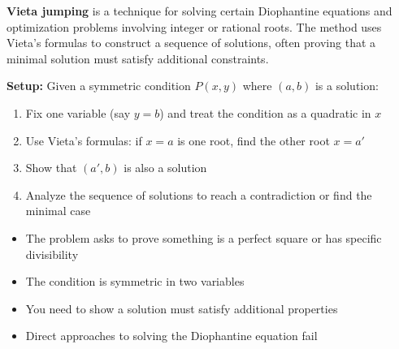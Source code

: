 \documentclass[12pt]{extarticle}
\begin{document}
\textbf{Vieta jumping} is a technique for solving certain Diophantine equations and optimization problems involving integer or rational roots. The method uses Vieta's formulas to construct a sequence of solutions, often proving that a minimal solution must satisfy additional constraints.

\begin{conceptbox}
\textbf{Setup:} Given a symmetric condition $P(x,y)$ where $(a,b)$ is a solution:
\begin{enumerate}
    \item Fix one variable (say $y=b$) and treat the condition as a quadratic in $x$
    \item Use Vieta's formulas: if $x=a$ is one root, find the other root $x=a'$
    \item Show that $(a',b)$ is also a solution
    \item Analyze the sequence of solutions to reach a contradiction or find the minimal case
\end{enumerate}
\end{conceptbox}

\begin{conceptbox}
\begin{itemize}
    \item The problem asks to prove something is a perfect square or has specific divisibility
    \item The condition is symmetric in two variables
    \item You need to show a solution must satisfy additional properties
    \item Direct approaches to solving the Diophantine equation fail
\end{itemize}
\end{conceptbox}
\end{document}
